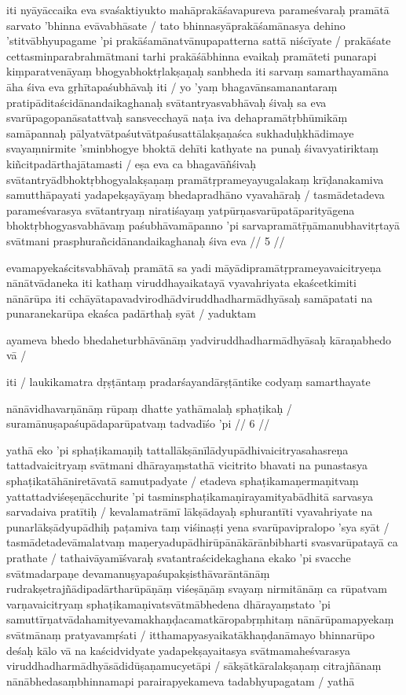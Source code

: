 iti nyāyāccaika eva svaśaktiyukto mahāprakāśavapureva parameśvaraḥ pramātā sarvato 'bhinna evāvabhāsate  / tato bhinnasyāprakāśamānasya dehino 'stitvābhyupagame 'pi prakāśamānatvānupapatterna sattā niścīyate  / prakāśate cettasminparabrahmātmani tarhi prakāśābhinna evaikaḥ pramāteti punarapi kiṃparatvenāyaṃ bhogyabhoktṛlakṣaṇaḥ sanbheda iti sarvaṃ samarthayamāna āha śiva eva gṛhītapaśubhāvaḥ iti  / yo 'yaṃ bhagavānsamanantaraṃ pratipāditaścidānandaikaghanaḥ svātantryasvabhāvaḥ śivaḥ sa eva svarūpagopanāsatattvaḥ sansvecchayā naṭa iva dehapramātṛbhūmikāṃ samāpannaḥ pālyatvātpaśutvātpaśusattālakṣaṇaśca sukhaduḥkhādimaye svayaṃnirmite 'sminbhogye bhoktā dehīti kathyate na punaḥ śivavyatiriktaṃ kiñcitpadārthajātamasti  / eṣa eva ca bhagavāñśivaḥ svātantryādbhoktṛbhogyalakṣaṇaṃ pramātṛprameyayugalakaṃ krīḍanakamiva samutthāpayati yadapekṣayāyaṃ bhedapradhāno vyavahāraḥ  / tasmādetadeva parameśvarasya svātantryaṃ niratiśayaṃ yatpūrṇasvarūpatāparityāgena bhoktṛbhogyasvabhāvaṃ paśubhāvamāpanno 'pi sarvapramātṝṇāmanubhavitṛtayā svātmani prasphurañcidānandaikaghanaḥ śiva eva  // 5  //

evamapyekaścitsvabhāvaḥ pramātā sa yadi māyādipramātṛprameyavaicitryeṇa nānātvādaneka iti kathaṃ viruddhayaikatayā vyavahriyata ekaścetkimiti nānārūpa iti cchāyātapavadvirodhādviruddhadharmādhyāsaḥ samāpatati na punaranekarūpa ekaśca padārthaḥ syāt  / yaduktam

ayameva bhedo bhedaheturbhāvānāṃ yadviruddhadharmādhyāsaḥ kāraṇabhedo vā  /

iti  / laukikamatra dṛṣṭāntaṃ pradarśayandārṣṭāntike codyaṃ samarthayate

nānāvidhavarṇānāṃ rūpaṃ dhatte yathāmalaḥ sphaṭikaḥ  /
suramānuṣapaśupādaparūpatvaṃ tadvadīśo 'pi  // 6  //

yathā eko 'pi sphaṭikamaṇiḥ tattallākṣānīlādyupādhivaicitryasahasreṇa tattadvaicitryaṃ svātmani dhārayaṃstathā vicitrito bhavati na punastasya sphaṭikatāhāniretāvatā samutpadyate  / etadeva sphaṭikamaṇermaṇitvaṃ yattattadviśeṣeṇācchurite 'pi tasminsphaṭikamaṇirayamityabādhitā sarvasya sarvadaiva pratītiḥ  / kevalamatrāmī lākṣādayaḥ sphurantīti vyavahriyate na punarlākṣādyupādhiḥ paṭamiva taṃ viśinaṣṭi yena svarūpavipralopo 'sya syāt  / tasmādetadevāmalatvaṃ maṇeryadupādhirūpānākārānbibharti svasvarūpatayā ca prathate  / tathaivāyamīśvaraḥ svatantraścidekaghana ekako 'pi svacche svātmadarpaṇe devamanuṣyapaśupakṣisthāvarāntānāṃ rudrakṣetrajñādipadārtharūpāṇāṃ viśeṣāṇāṃ svayaṃ nirmitānāṃ ca rūpatvam varṇavaicitryaṃ sphaṭikamaṇivatsvātmābhedena dhārayaṃstato 'pi samuttīrṇatvādahamityevamakhaṇḍacamatkāropabṛṃhitaṃ nānārūpamapyekaṃ svātmānaṃ pratyavamṛśati  / itthamapyasyaikatākhaṇḍanāmayo bhinnarūpo deśaḥ kālo vā na kaścidvidyate yadapekṣayaitasya svātmamaheśvarasya viruddhadharmādhyāsādidūṣaṇamucyetāpi  / sākṣātkāralakṣaṇaṃ citrajñānaṃ nānābhedasaṃbhinnamapi parairapyekameva tadabhyupagatam  / yathā

